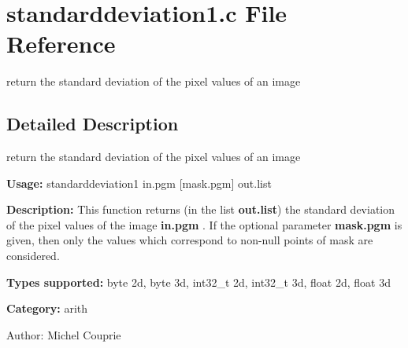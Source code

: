 \section{standarddeviation1.c File Reference}
\label{standarddeviation1_8c}
return the standard deviation of the pixel values of an image  




\label{_details}
\subsection{Detailed Description}
return the standard deviation of the pixel values of an image 

{\bf Usage:} standarddeviation1 in.pgm [mask.pgm] out.list

{\bf Description:} This function returns (in the list {\bf out.list}) the standard deviation of the pixel values of the image {\bf in.pgm} . If the optional parameter {\bf mask.pgm} is given, then only the values which correspond to non-null points of mask are considered.

{\bf Types supported:} byte 2d, byte 3d, int32\_\-t 2d, int32\_\-t 3d, float 2d, float 3d

{\bf Category:} arith

\begin{Desc}
\item[Author:]Michel Couprie \end{Desc}

